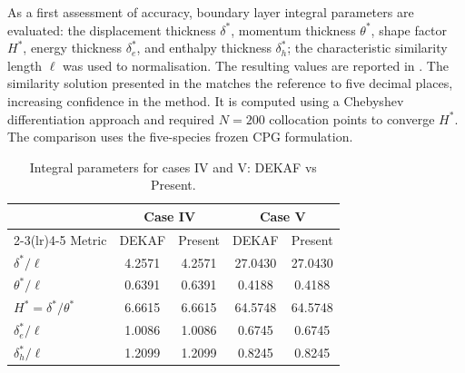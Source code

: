 As a first assessment of accuracy, boundary layer integral parameters are evaluated: the displacement thickness $\delta^*$, momentum thickness $\theta^*$, shape factor $H^*$, energy thickness $\delta_e^*$, and enthalpy thickness $\delta_h^*$; the characteristic similarity length $\ell$ was used to normalisation. The resulting values are reported in . The similarity solution presented in the  matches the reference to five decimal places, increasing confidence in the method. It is computed using a Chebyshev differentiation approach and required $N=200$ collocation points to converge $H^*$. The comparison uses the five-species frozen \gls{CPG} formulation.

\begin{table}[t]
  \centering
  \caption{Integral parameters for cases IV and V: DEKAF vs Present.}
  \label{tab:integral_params_compare_iv_v}
  \setlength{\tabcolsep}{6pt}
  \small
  \begin{tabular}{@{}lcccc@{}}
    \toprule
    & \multicolumn{2}{c}{Case IV} & \multicolumn{2}{c}{Case V} \\
    \cmidrule(lr){2-3}\cmidrule(lr){4-5}
    Metric & DEKAF & Present & DEKAF & Present \\
    \midrule
    $\delta^*/\ell$        & 4.2571  & 4.2571  & 27.0430 & 27.0430 \\
    $\theta^*/\ell$        & 0.6391  & 0.6391  & 0.4188  & 0.4188  \\
    $H^*=\delta^*/\theta^*$& 6.6615  & 6.6615  & 64.5748 & 64.5748 \\
    $\delta_e^*/\ell$      & 1.0086  & 1.0086  & 0.6745  & 0.6745  \\
    $\delta_h^*/\ell$      & 1.2099  & 1.2099  & 0.8245  & 0.8245  \\
    \bottomrule
  \end{tabular}
\end{table}


